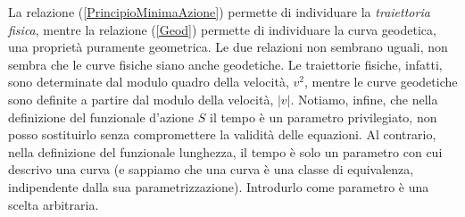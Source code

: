 \documentclass[a4paper,openany]{article}
\begin{document}
	La relazione (\ref{PrincipioMinimaAzione}) permette di individuare la \textit{traiettoria fisica}, mentre la relazione (\ref{Geod}) permette di individuare la curva geodetica, una proprietà puramente geometrica. Le due relazioni non sembrano uguali, non sembra che le curve fisiche siano anche geodetiche. Le traiettorie fisiche, infatti, sono determinate dal modulo quadro della velocità, $v^2$, mentre le curve geodetiche sono definite a partire dal modulo della velocità, $|v|$. Notiamo, infine, che nella definizione del funzionale d'azione $S$ il tempo è un parametro privilegiato, non posso sostituirlo senza compromettere la validità delle equazioni. Al contrario, nella definizione del funzionale lunghezza, il tempo è solo un parametro con cui descrivo una curva (e sappiamo che una curva è una classe di equivalenza, indipendente dalla sua parametrizzazione). Introdurlo come parametro è una scelta arbitraria.
	
\end{document}
